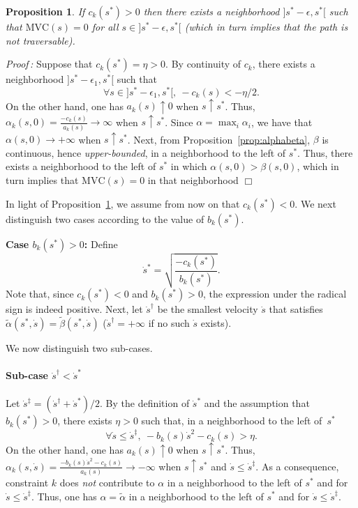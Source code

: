 \documentclass[9pt,technote]{IEEEtran}
\newcommand{\MVC}{\mathrm{MVC}}
\newtheorem{Prop}{Proposition}
\begin{document}
\begin{Prop}
  \label{prop:c}
  If $c_k(s^*)>0$ then there exists a neighborhood
  $]s^*-\epsilon,s^*[$ such that $\MVC(s)=0$ for all
      $s\in]s^*-\epsilon,s^*[$ (which in turn implies that the path is
      not traversable).
\end{Prop}

\emph{Proof\,:} Suppose  that $c_k(s^*)=\eta>0$.  By
continuity of $c_k$, there exists a neighborhood
$]s^*-\epsilon_1,s^*[$ such that
\[
\forall s\in ]s^*-\epsilon_1,s^*[, \ -c_k(s)<-\eta/2.
\]
On the other hand, one has $a_k(s) \uparrow 0$ when $s\uparrow
s^*$. Thus, $\alpha_k(s,0) = \frac{-c_k(s)}{a_k(s)} \to \infty$ when
$s\uparrow s^*$. Since $\alpha=\max_i\alpha_i$, we have that
$\alpha(s,0) \to +\infty$ when $s\uparrow s^*$. Next, from
Proposition~\ref{prop:alphabeta}, $\beta$ is continuous, hence
\emph{upper-bounded}, in a neighborhood to the left of $s^*$. Thus,
there exists a neighborhood to the left of $s^*$ in which
$\alpha(s,0)>\beta(s,0)$, which in turn implies that $\MVC(s)=0$ in
that neighborhood $\Box$

In light of Proposition~\ref{prop:c}, we assume from now on that
$c_k(s^*)<0$. We next distinguish two cases according to the value of
$b_k(s^*)$.



\textbf{Case $b_k(s^*)>0$:} Define
\begin{equation}
  \label{eq:sdotstar}
  \dot{s}^*=\sqrt{\frac{-c_k(s^*)}{b_k(s^*)}}.
\end{equation}
Note that, since $c_k(s^*)<0$ and $b_k(s^*)>0$, the expression under
the radical sign is indeed positive. Next, let $\dot{s}^\dag{}$ be the
smallest velocity $\dot s$ that satisfies $\tilde{\alpha}(s^*,\dot
s)=\tilde{\beta}(s^*,\dot s)$ ($\dot{s}^\dag{}=+\infty$ if no such
$\dot s$ exists).

We now distinguish two sub-cases.

\paragraph{Sub-case $\dot{s}^\dag{}<\dot s^*$}

Let $\dot s^\ddag{}=(\dot{s}^\dag{}+\dot s^*)/2$. By the definition of
$\dot{s}^*$ and the assumption that $b_k(s^*)>0$, there exists
$\eta>0$ such that, in a neighborhood to the left of~$s^*$ 
\[
\forall \dot s\leq \dot s^\ddag{},\ 
-b_k(s)\dot s^2-c_k(s)>\eta.
\]
On the other hand, one has $a_k(s) \uparrow 0$ when $s\uparrow
s^*$. Thus, $\alpha_k(s,\dot s) = \frac{-b_k(s)\dot
  s^2-c_k(s)}{a_k(s)} \to -\infty$ when $s\uparrow s^*$ and $\dot
s\leq \dot{s}^\ddag$. As a consequence, constraint $k$ does \emph{not}
contribute to $\alpha$ in a neighborhood to the left of $s^*$ and for
$\dot s \leq \dot s^\ddag{}$. Thus, one has $\alpha = \tilde{\alpha}$
in a neighborhood to the left of $s^*$ and for $\dot s \leq \dot
s^\ddag{}$.
\end{document}
